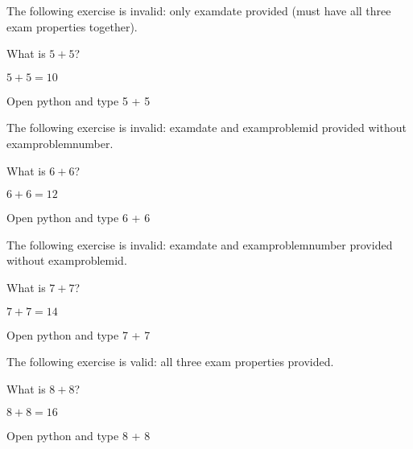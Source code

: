 \documentclass[oneside]{book}
\begin{document}
The following exercise is invalid: only examdate provided (must have all three exam properties together).

\begin{exercise}[examdate={January 15, 2020}]
  What is \(5 + 5\)?
\end{exercise}
\begin{solution}
  \(5 + 5 = 10\)
\end{solution}
\begin{additionalinformation}
Open python and type 5 + 5
\end{additionalinformation}

The following exercise is invalid: examdate and examproblemid provided without examproblemnumber.

\begin{exercise}[examdate={January 15, 2020}, examproblemid={2020-01-15-06}]
  What is \(6 + 6\)?
\end{exercise}
\begin{solution}
  \(6 + 6 = 12\)
\end{solution}
\begin{additionalinformation}
Open python and type 6 + 6
\end{additionalinformation}

The following exercise is invalid: examdate and examproblemnumber provided without examproblemid.

\begin{exercise}[examdate={January 15, 2020}, examproblemnumber={7}]
  What is \(7 + 7\)?
\end{exercise}
\begin{solution}
  \(7 + 7 = 14\)
\end{solution}
\begin{additionalinformation}
Open python and type 7 + 7
\end{additionalinformation}

The following exercise is valid: all three exam properties provided.

\begin{exercise}[examdate={January 15, 2020}, examproblemnumber={8}, examproblemid={2020-01-15-08}]
  What is \(8 + 8\)?
\end{exercise}
\begin{solution}
  \(8 + 8 = 16\)
\end{solution}
\begin{additionalinformation}
Open python and type 8 + 8
\end{additionalinformation}
\end{document}

